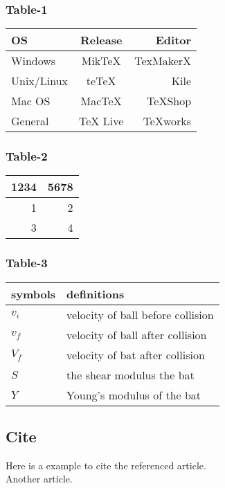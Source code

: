 \documentclass{mcmthesis}
\begin{document}
\subsubsection{Table-1}
\begin{tabular}{|l|c|r|}
 \hline
OS & Release & Editor\\
 \hline
Windows & MikTeX & TexMakerX \\
 \hline
Unix/Linux & teTeX & Kile \\
 \hline
Mac OS & MacTeX & TeXShop \\
 \hline
General & TeX Live & TeXworks \\
 \hline
\end{tabular}
 
\subsubsection{Table-2}
\begin{tabular}{|r r|}
\hline
1234 & 5678 \\ \hline
1 &  2 \\ \hline
3 & 4 \\ \hline
\end{tabular}
\subsubsection{Table-3}
\begin{tabular}{ll}
\hline
symbols&definitions\\
\hline
$v_i$& velocity of ball before collision\\
$v_f$& velocity of ball after collision\\
$V_f$& velocity of bat after collision\\
$S$ & the shear modulus the bat\\
$Y$ & Young’s modulus of the bat\\
\hline
\end{tabular}
\subsection{Cite}
Here is a example to cite the referenced article\cite{konishi:1999ab}. \\
Another article\cite{refName}.
\end{document}
